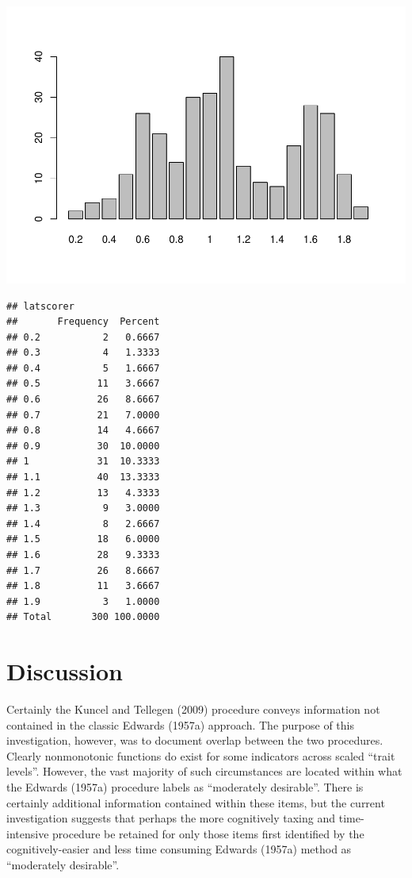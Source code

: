 \documentclass[
  english,
  ,jou]{apa6}
\begin{document}
\includegraphics{KuncelTellegen2_files/figure-latex/getQualtrics-4.pdf}

\begin{verbatim}
## latscorer 
##       Frequency  Percent
## 0.2           2   0.6667
## 0.3           4   1.3333
## 0.4           5   1.6667
## 0.5          11   3.6667
## 0.6          26   8.6667
## 0.7          21   7.0000
## 0.8          14   4.6667
## 0.9          30  10.0000
## 1            31  10.3333
## 1.1          40  13.3333
## 1.2          13   4.3333
## 1.3           9   3.0000
## 1.4           8   2.6667
## 1.5          18   6.0000
## 1.6          28   9.3333
## 1.7          26   8.6667
## 1.8          11   3.6667
## 1.9           3   1.0000
## Total       300 100.0000
\end{verbatim}

\hypertarget{discussion}{%
\section{Discussion}\label{discussion}}

Certainly the Kuncel and Tellegen (2009) procedure conveys information not contained in the classic Edwards (1957a) approach. The purpose of this investigation, however, was to document overlap between the two procedures. Clearly nonmonotonic functions do exist for some indicators across scaled \enquote{trait levels}. However, the vast majority of such circumstances are located within what the Edwards (1957a) procedure labels as \enquote{moderately desirable}. There is certainly additional information contained within these items, but the current investigation suggests that perhaps the more cognitively taxing and time-intensive procedure be retained for only those items first identified by the cognitively-easier and less time consuming Edwards (1957a) method as \enquote{moderately desirable}.
\end{document}
